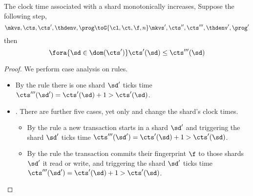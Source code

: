 \begin{lemma}
    \label{lem:mono-shard-clock-time}
    The clock time associated with a shard monotonically increases,
    Suppose the following step,
    \[
        \mkvs,\cts,\cts',\thdenv, \prog \toG{\cl,\ct,\f,n} \mkvs',\cts'',\cts''',\thdenv', \prog'
    \]
    then 
    \[
        \fora{\sd \in \dom(\cts')} \cts'(\sd) \leq \cts'''(\sd)
    \]
\end{lemma}
\begin{proof}
    We perform case analysis on rules.
    \begin{itemize}
        \item {}
            By the rule there is one shard \( \sd' \) ticks time \( \cts'''(\sd') = \cts'(\sd) + 1 > \cts'(\sd) \).
        \item {}.
            There are further five cases, yet only  and  change the shard's clock times.
            \begin{itemize}
                \item {}
                    By the rule a new transaction starts in a shard \( \sd' \) and triggering the shard \( \sd' \) ticks time \( \cts'''(\sd') = \cts'(\sd) + 1 > \cts'(\sd) \).
                \item {}
                    By the rule the transaction commits their fingerprint \( \f \) to those shards \( \sd' \) it read or write, and triggering the shard \( \sd' \) ticks time \( \cts'''(\sd') = \cts'(\sd) + 1 > \cts'(\sd) \).
            \end{itemize}
    \end{itemize}
\end{proof}

